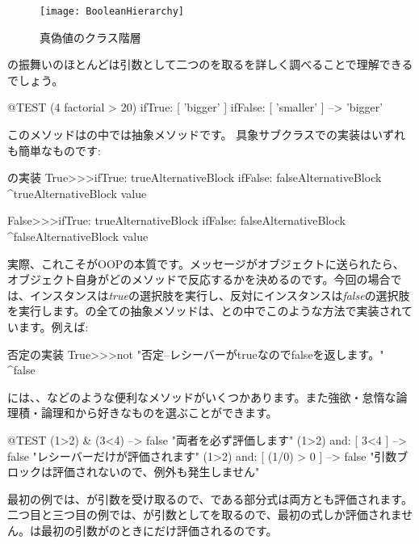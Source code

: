 \documentclass[a4paper,10pt,twoside]{book}
\begin{document}
\begin{figure}[ht]
  {\centerline {\texttt{[image: BooleanHierarchy]}}}
\caption{真偽値のクラス階層 }
\end{figure}

の振舞いのほとんどは引数として二つのを取るを詳しく調べることで理解できるでしょう。

\begin{code}{@TEST}
(4 factorial > 20) ifTrue: [ 'bigger' ] ifFalse: [ 'smaller' ] --> 'bigger'
\end{code}

このメソッドはの中では抽象メソッドです。
具象サブクラスでの実装はいずれも簡単なものです:

\begin{method}{の実装}
True>>>ifTrue: trueAlternativeBlock ifFalse: falseAlternativeBlock 
    ^trueAlternativeBlock value

False>>>ifTrue: trueAlternativeBlock ifFalse: falseAlternativeBlock 
    ^falseAlternativeBlock value
\end{method}

実際、これこそがOOPの本質です。メッセージがオブジェクトに送られたら、オブジェクト自身がどのメソッドで反応するかを決めるのです。今回の場合では、インスタンスは\emph{true}の選択肢を実行し、反対にインスタンスは\emph{false}の選択肢を実行します。の全ての抽象メソッドは、との中でこのような方法で実装されています。例えば:

\begin{method}{否定の実装}
True>>>not
    "否定--レシーバーがtrueなのでfalseを返します。"
    ^false
\end{method}

には、、などのような便利なメソッドがいくつかあります。また強欲・怠惰な論理積・論理和から好きなものを選ぶことができます。

\begin{code}{@TEST}
(1>2) & (3<4)              --> false    "両者を必ず評価します"
(1>2) and: [ 3<4 ]        --> false    "レシーバーだけが評価されます"
(1>2) and: [ (1/0) > 0 ] --> false    "引数ブロックは評価されないので、例外も発生しません"
\end{code}

最初の例では、が引数を受け取るので、である部分式は両方とも評価されます。
二つ目と三つ目の例では、が引数としてを取るので、最初の式しか評価されません。は最初の引数がのときにだけ評価されるのです。
\end{document}
